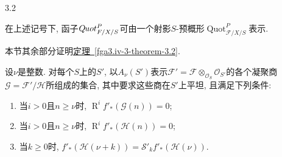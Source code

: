 \begin{theorem}{3.2}\label{fga3.iv-3-theorem-3.2}\skipsinglepar
\par{}在上述记号下, 函子\(\mathscr {Q}\kern  -.75pt\mathit {uot}_{\mathscr {F}/X/S}^P\)可由一个射影\(S\)-预概形\(\operatorname {Quot}_{\mathscr {F}/X/S}^P\)表示.
\end{theorem}
\par{}本节其余部分证明\hyperref[fga3.iv-3-theorem-3.2]{定理~\ref*{fga3.iv-3-theorem-3.2}}.
\par{}设\(\nu \)是整数. 对每个\(S\)上的\(S'\), 以\(A_\nu (S')\)表示\(\mathscr {F}'=\mathscr {F}\otimes _{\mathcal {O}_S}\mathcal {O}_{S'}\)的各个凝聚商\(\mathscr {G}=\mathscr {F}'/\mathscr {H}\)所组成的集合, 其中要求这些商在\(S'\)上平坦, 且满足下列条件: 
\begin{enumerate}
    
 \item[a.]当\(i>0\)且\(n\geqslant \nu \)时, \(\operatorname {R}^i f'_*(\mathscr {G} (n))=0\);

    
 \item[b.]当\(i>0\)且\(n\geqslant \nu \)时, \(\operatorname {R}^i f'_*(\mathscr {H} (n))=0\);

    
 \item[c.]当\(k\geqslant 0\)时, \(f'_*(\mathscr {H} (\nu +k))=\mathcal {S}'_k f'_*(\mathscr {H} (\nu ))\).


\end{enumerate}
